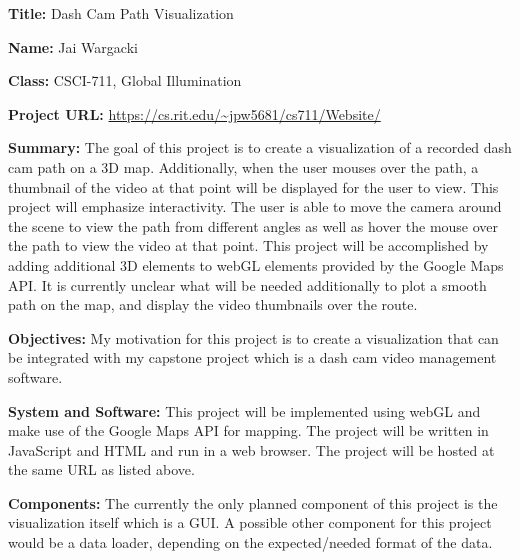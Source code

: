\documentclass{article}
\begin{document}
\textbf{Title:} Dash Cam Path Visualization

\textbf{Name:} Jai Wargacki

\textbf{Class:} CSCI-711, Global Illumination

\textbf{Project URL:} \url{https://cs.rit.edu/~jpw5681/cs711/Website/}

\textbf{Summary:} The goal of this project is to create a visualization of a recorded dash cam path on a 3D map.
Additionally, when the user mouses over the path, a thumbnail of the video at that point will be displayed for the user to view.
This project will emphasize interactivity. The user is able to move the camera around the scene to view the path from different angles
as well as hover the mouse over the path to view the video at that point. This project will be accomplished by adding additional 3D elements to 
webGL elements provided by the Google Maps API. It is currently unclear what will be needed additionally to plot a smooth path on the map, and
display the video thumbnails over the route.

\textbf{Objectives:} My motivation for this project is to create a visualization that can be integrated with my capstone project which 
is a dash cam video management software.

\textbf{System and Software:} This project will be implemented using webGL and make use of the Google Maps API for mapping. 
The project will be written in JavaScript and HTML and run in a web browser.
The project will be hosted at the same URL as listed above.

\textbf{Components:} The currently the only planned component of this project is the visualization itself which is a GUI. A possible other 
component for this project would be a data loader, depending on the expected/needed format of the data.
\end{document}
